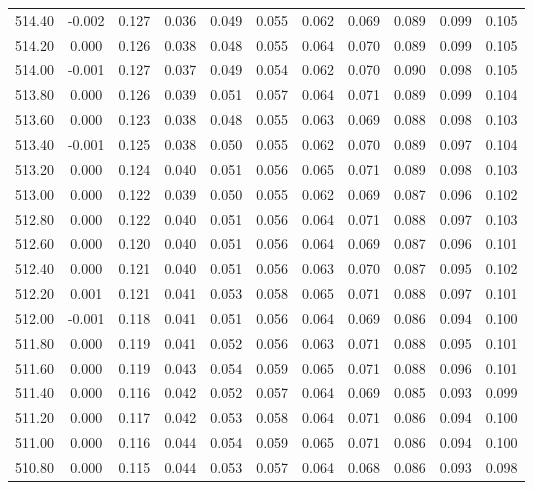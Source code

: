 \begin{longtable}{cccccccccc}
    514.40 & -0.002 &  0.127 &  0.036 &  0.049 &  0.055 &  0.062 &  0.069 &  0.089 &  0.099 &  0.105 \\
    514.20 &  0.000 &  0.126 &  0.038 &  0.048 &  0.055 &  0.064 &  0.070 &  0.089 &  0.099 &  0.105 \\
    514.00 & -0.001 &  0.127 &  0.037 &  0.049 &  0.054 &  0.062 &  0.070 &  0.090 &  0.098 &  0.105 \\
    513.80 &  0.000 &  0.126 &  0.039 &  0.051 &  0.057 &  0.064 &  0.071 &  0.089 &  0.099 &  0.104 \\
    513.60 &  0.000 &  0.123 &  0.038 &  0.048 &  0.055 &  0.063 &  0.069 &  0.088 &  0.098 &  0.103 \\
    513.40 & -0.001 &  0.125 &  0.038 &  0.050 &  0.055 &  0.062 &  0.070 &  0.089 &  0.097 &  0.104 \\
    513.20 &  0.000 &  0.124 &  0.040 &  0.051 &  0.056 &  0.065 &  0.071 &  0.089 &  0.098 &  0.103 \\
    513.00 &  0.000 &  0.122 &  0.039 &  0.050 &  0.055 &  0.062 &  0.069 &  0.087 &  0.096 &  0.102 \\
    512.80 &  0.000 &  0.122 &  0.040 &  0.051 &  0.056 &  0.064 &  0.071 &  0.088 &  0.097 &  0.103 \\
    512.60 &  0.000 &  0.120 &  0.040 &  0.051 &  0.056 &  0.064 &  0.069 &  0.087 &  0.096 &  0.101 \\
    512.40 &  0.000 &  0.121 &  0.040 &  0.051 &  0.056 &  0.063 &  0.070 &  0.087 &  0.095 &  0.102 \\
    512.20 &  0.001 &  0.121 &  0.041 &  0.053 &  0.058 &  0.065 &  0.071 &  0.088 &  0.097 &  0.101 \\
    512.00 & -0.001 &  0.118 &  0.041 &  0.051 &  0.056 &  0.064 &  0.069 &  0.086 &  0.094 &  0.100 \\
    511.80 &  0.000 &  0.119 &  0.041 &  0.052 &  0.056 &  0.063 &  0.071 &  0.088 &  0.095 &  0.101 \\
    511.60 &  0.000 &  0.119 &  0.043 &  0.054 &  0.059 &  0.065 &  0.071 &  0.088 &  0.096 &  0.101 \\
    511.40 &  0.000 &  0.116 &  0.042 &  0.052 &  0.057 &  0.064 &  0.069 &  0.085 &  0.093 &  0.099 \\
    511.20 &  0.000 &  0.117 &  0.042 &  0.053 &  0.058 &  0.064 &  0.071 &  0.086 &  0.094 &  0.100 \\
    511.00 &  0.000 &  0.116 &  0.044 &  0.054 &  0.059 &  0.065 &  0.071 &  0.086 &  0.094 &  0.100 \\
    510.80 &  0.000 &  0.115 &  0.044 &  0.053 &  0.057 &  0.064 &  0.068 &  0.086 &  0.093 &  0.098 \\

\end{longtable}

